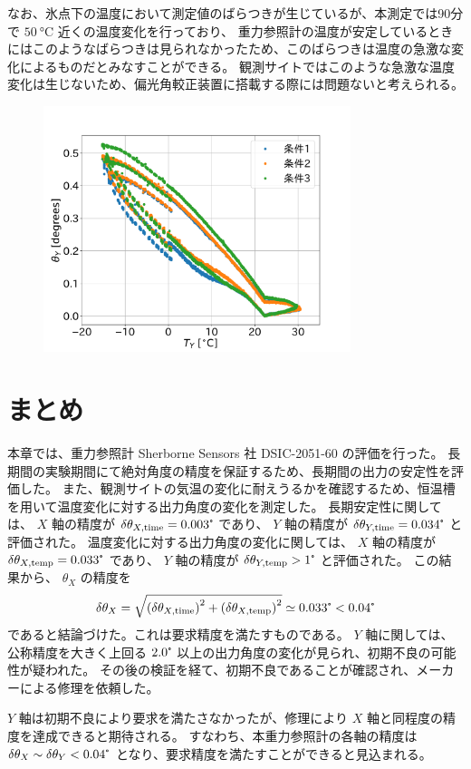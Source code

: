 \documentclass[../../main.tex]{subfiles}
\begin{document}
なお、氷点下の温度において測定値のばらつきが生じているが、本測定では90分で $\SI{50}{\degreeCelsius}$ 近くの温度変化を行っており、
重力参照計の温度が安定しているときにはこのようなばらつきは見られなかったため、このばらつきは温度の急激な変化によるものだとみなすことができる。
観測サイトではこのような急激な温度変化は生じないため、偏光角較正装置に搭載する際には問題ないと考えられる。
\begin{figure}[H]
    \centering
    \includegraphics[width=0.8\textwidth]{tiltsensor/angleY_huryou_test.pdf}
    \label{fig:angleY_huryou_test}
\end{figure}
\section{まとめ}
本章では、重力参照計 Sherborne Sensors 社 DSIC-2051-60 の評価を行った。
長期間の実験期間にて絶対角度の精度を保証するため、長期間の出力の安定性を評価した。
また、観測サイトの気温の変化に耐えうるかを確認するため、恒温槽を用いて温度変化に対する出力角度の変化を測定した。
長期安定性に関しては、 $X$ 軸の精度が $\delta\theta_{X,\mathrm{time}} = 0.003\tcdegree$ であり、
$Y$ 軸の精度が $\delta\theta_{Y,\mathrm{time}} = 0.034\tcdegree$ と評価された。
温度変化に対する出力角度の変化に関しては、 $X$ 軸の精度が $\delta\theta_{X,\mathrm{temp}} = 0.033\tcdegree$ であり、
$Y$ 軸の精度が $\delta\theta_{Y,\mathrm{temp}} > 1\tcdegree$ と評価された。
この結果から、 $\theta_{X}$ の精度を 
\begin{equation}
    \delta\theta_X = \sqrt{\qty(\delta\theta_{X,\mathrm{time}})^2 + \qty(\delta\theta_{X,\mathrm{temp}})^2}\simeq 0.033\tcdegree < 0.04\tcdegree
\end{equation}
であると結論づけた。これは要求精度を満たすものである。
$Y$ 軸に関しては、公称精度を大きく上回る $2.0\tcdegree$ 以上の出力角度の変化が見られ、初期不良の可能性が疑われた。
その後の検証を経て、初期不良であることが確認され、メーカーによる修理を依頼した。

$Y$ 軸は初期不良により要求を満たさなかったが、修理により $X$ 軸と同程度の精度を達成できると期待される。
すなわち、本重力参照計の各軸の精度は $\delta\theta_X\sim\delta\theta_Y<0.04\tcdegree$ となり、要求精度を満たすことができると見込まれる。
\end{document}
